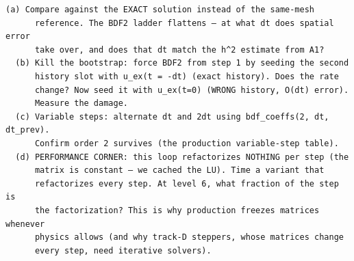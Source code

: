 \begin{explore}
\begin{verbatim}
(a) Compare against the EXACT solution instead of the same-mesh
      reference. The BDF2 ladder flattens — at what dt does spatial error
      take over, and does that dt match the h^2 estimate from A1?
  (b) Kill the bootstrap: force BDF2 from step 1 by seeding the second
      history slot with u_ex(t = -dt) (exact history). Does the rate
      change? Now seed it with u_ex(t=0) (WRONG history, O(dt) error).
      Measure the damage.
  (c) Variable steps: alternate dt and 2dt using bdf_coeffs(2, dt, dt_prev).
      Confirm order 2 survives (the production variable-step table).
  (d) PERFORMANCE CORNER: this loop refactorizes NOTHING per step (the
      matrix is constant — we cached the LU). Time a variant that
      refactorizes every step. At level 6, what fraction of the step is
      the factorization? This is why production freezes matrices whenever
      physics allows (and why track-D steppers, whose matrices change
      every step, need iterative solvers).
\end{verbatim}
\end{explore}
